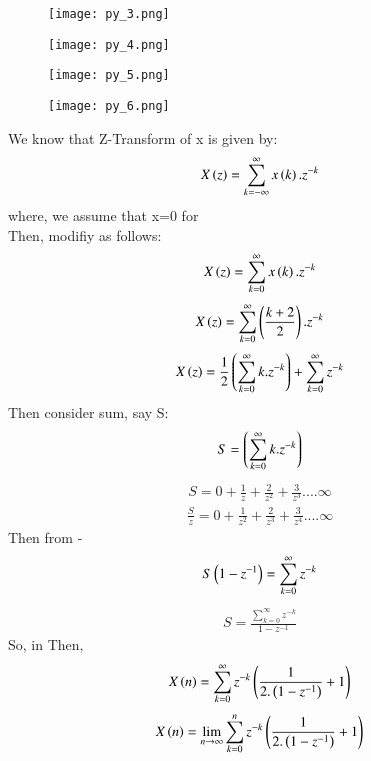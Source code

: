 \documentclass[beamer]{IEEEtran}
\theoremstyle{remark}
\begin{document}
\begin{figure}[h]
    \centering
    \texttt{[image: py\_3.png]}
    \label{fig:enter-label}
\end{figure}

\begin{figure}[h]
    \centering
    \texttt{[image: py\_4.png]}
    \label{fig:enter-label}
\end{figure}

\begin{figure}[h]
    \centering
    \texttt{[image: py\_5.png]}
    \label{fig:enter-label}
\end{figure}

\begin{figure}[h]
    \centering
    \texttt{[image: py\_6.png]}
    \label{fig:enter-label}
\end{figure}
We know that Z-Transform of x is given by:
\begin{align}
\label{a13}
    X\left(z\right)=\sum_{k=-\infty}^{\infty} x\left(k\right).z^{-k}
\end{align}
where, we assume that x=0   for \\
Then, \brak{\ref{a13}} modifiy as follows:
\begin{align}
\label{a14}
    X\left(z\right)=\sum_{k=0}^{\infty} x\left(k\right).z^{-k}
\end{align}
$$X\left(z\right)=\sum_{k=0}^{\infty} \left(\frac{k+2}{2}\right).z^{-k}$$
\begin{align}
    \label{a15}
    X\left(z\right)=\frac{1}{2}\left(\sum_{k=0}^{\infty}k.z^{-k}\right)+\sum_{k=0}^{\infty}z^{-k}
\end{align}
Then consider sum, say S:
$$S=\left(\sum_{k=0}^{\infty}k.z^{-k}\right)$$
\begin{align}
\label{a16}
S=0+\frac{1}{z}+\frac{2}{z^2}+\frac{3}{z^3}....\infty
\end{align}
\begin{align}
\label{a17}
\frac{S}{z}=0+\frac{1}{z^2}+\frac{2}{z^3}+\frac{3}{z^4}....\infty
\end{align}
Then from \brak{\ref{a17}}-\brak{\ref{a16}}
$$S\left(1-z^{-1}\right)=\sum_{k=0}^{\infty}z^{-k}$$
\begin{align}
\label{a18}
    S=\frac{\sum_{k=0}^{\infty}z^{-k}}{1-z^{-1}}
\end{align}
So,\brak{\ref{a18}} in \brak{\ref{a15}} Then,
$$X\left(n\right)=\sum_{k=0}^{\infty}z^{-k}\left(\frac{1}{2.\left(1-z^{-1}\right)}+1\right)$$
$$X\left(n\right)=\lim_{n\to\infty}\sum_{k=0}^{n}z^{-k}\left(\frac{1}{2.\left(1-z^{-1}\right)}+1\right)$$
\end{document}

